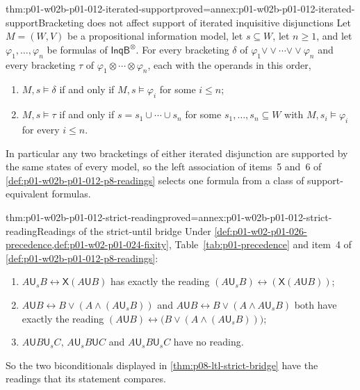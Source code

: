 \begin{hblemma}{thm:p01-w02b-p01-012-iterated-support}{proved=annex:p01-w02b-p01-012-iterated-support}{Bracketing does not affect support of iterated inquisitive disjunctions}
Let \(M=(W,V)\) be a propositional information model, let \(s\subseteq W\),
let \(n\geq1\), and let \(\varphi_1,\ldots,\varphi_n\) be formulas of
\(\mathsf{InqB}^{\otimes}\).  For every bracketing \(\delta\) of
\(\varphi_1\mathbin{\vee\!\vee}\cdots\mathbin{\vee\!\vee}\varphi_n\) and
every bracketing \(\tau\) of
\(\varphi_1\otimes\cdots\otimes\varphi_n\), each with the operands in
this order,
\begin{enumerate}
\item \(M,s\models\delta\) if and only if \(M,s\models\varphi_i\) for some
  \(i\leq n\);
\item \(M,s\models\tau\) if and only if \(s=s_1\cup\cdots\cup s_n\) for
  some \(s_1,\ldots,s_n\subseteq W\) with \(M,s_i\models\varphi_i\) for
  every \(i\leq n\).
\end{enumerate}
In particular any two bracketings of either iterated disjunction are
supported by the same states of every model, so the left association of
items~5 and~6 of \cref{def:p01-w02b-p01-012-p8-readings} selects one
formula from a class of support-equivalent formulas.
\end{hblemma}

\begin{hblemma}{thm:p01-w02b-p01-012-strict-reading}{proved=annex:p01-w02b-p01-012-strict-reading}{Readings of the strict-until bridge}
Under \cref{def:p01-w02-p01-026-precedence,def:p01-w02-p01-024-fixity},
Table~\ref{tab:p01-precedence} and item~4 of
\cref{def:p01-w02b-p01-012-p8-readings}:
\begin{enumerate}
\item \(A\mathbin{\mathsf U_s}B\leftrightarrow\mathsf X(A\mathbin{\mathsf U}B)\)
  has exactly the reading
  \((A\mathbin{\mathsf U_s}B)\leftrightarrow(\mathsf X(A\mathbin{\mathsf U}B))\);
\item \(A\mathbin{\mathsf U}B\leftrightarrow B\lor(A\land(A\mathbin{\mathsf U_s}B))\)
  and \(A\mathbin{\mathsf U}B\leftrightarrow B\lor(A\land A\mathbin{\mathsf U_s}B)\)
  both have exactly the reading
  \((A\mathbin{\mathsf U}B)\leftrightarrow\bigl(B\lor(A\land(A\mathbin{\mathsf U_s}B))\bigr)\);
\item \(A\mathbin{\mathsf U}B\mathbin{\mathsf U_s}C\),
  \(A\mathbin{\mathsf U_s}B\mathbin{\mathsf U}C\) and
  \(A\mathbin{\mathsf U_s}B\mathbin{\mathsf U_s}C\) have no reading.
\end{enumerate}
So the two biconditionals displayed in \cref{thm:p08-ltl-strict-bridge}
have the readings that its statement compares.
\end{hblemma}

